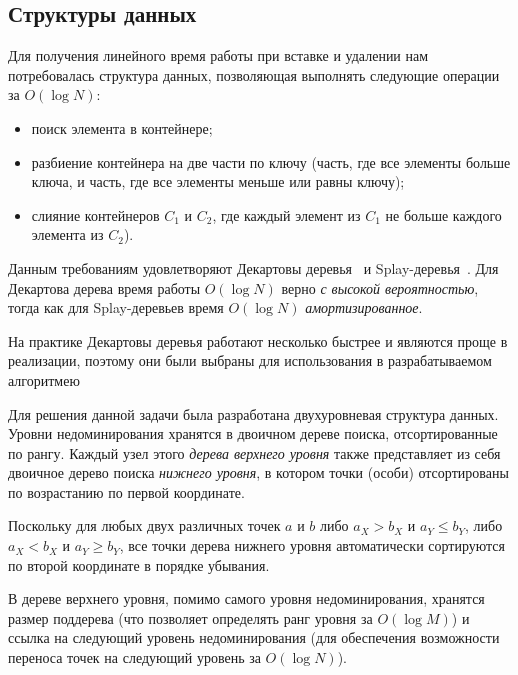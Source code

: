 \subsection{Структуры данных}
\label{algo-ds}
Для получения линейного время работы при вставке и удалении нам потребовалась структура данных,
позволяющая выполнять следующие операции за $O(\log N)$:
\begin{itemize}
	\item поиск элемента в контейнере;
	\item разбиение контейнера на две части по ключу (часть, где все элементы больше ключа, и часть,
	где все элементы меньше или равны ключу);
	\item слияние контейнеров $C_1$ и $C_2$, где каждый элемент из $C_1$ не больше каждого элемента 
	из $C_2$).
\end{itemize}

Данным требованиям удовлетворяют Декартовы деревья~\cite{cartesian-tree} и Splay-деревья~\cite{splay-tree}.
Для Декартова дерева время работы $O(\log N)$ верно \emph{с высокой вероятностью}, тогда как 
для Splay-деревьев время $O(\log N)$ \emph{амортизированное}.

На практике Декартовы деревья работают несколько быстрее и являются проще в реализации, поэтому они
были выбраны для использования в разрабатываемом алгоритмею

Для решения данной задачи была разработана двухуровневая структура данных.
Уровни недоминирования хранятся в двоичном дереве поиска, отсортированные по рангу.
Каждый узел этого \textit{дерева верхнего уровня} также представляет из себя двоичное дерево поиска
\textit{нижнего уровня}, в котором точки (особи) отсортированы по возрастанию по первой координате.

Поскольку для любых двух различных точек $a$ и $b$ либо $a_X > b_X$ и $a_Y \le b_Y$, либо
$a_X < b_X$ и $a_Y \ge b_Y$, все точки дерева нижнего уровня автоматически сортируются по второй
координате в порядке убывания.

В дереве верхнего уровня, помимо самого уровня недоминирования, хранятся размер поддерева (что
позволяет определять ранг уровня за $O(\log M)$) и ссылка на следующий уровень недоминирования
(для обеспечения возможности переноса точек на следующий уровень за $O(\log N)$).

